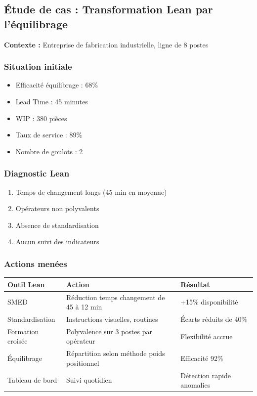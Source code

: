 \documentclass[12pt,a4paper]{article}
\begin{document}
\begin{center}
\subsection{Étude de cas : Transformation Lean par l'équilibrage}

\textbf{Contexte :} Entreprise de fabrication industrielle, ligne de 8 postes

\subsubsection{Situation initiale}
\begin{itemize}
    \item Efficacité équilibrage : 68\%
    \item Lead Time : 45 minutes
    \item WIP : 380 pièces
    \item Taux de service : 89\%
    \item Nombre de goulots : 2
\end{itemize}

\subsubsection{Diagnostic Lean}
\begin{enumerate}
    \item Temps de changement longs (45 min en moyenne)
    \item Opérateurs non polyvalents
    \item Absence de standardisation
    \item Aucun suivi des indicateurs
\end{enumerate}

\subsubsection{Actions menées}
\begin{table}[H]
\centering
\begin{tabular}{|p{3cm}|p{4cm}|p{5cm}|}
\hline
\textbf{Outil Lean} & \textbf{Action} & \textbf{Résultat} \\
\hline
SMED & Réduction temps changement de 45 à 12 min & +15\% disponibilité \\
\hline
Standardisation & Instructions visuelles, routines & Écarts réduits de 40\% \\
\hline
Formation croisée & Polyvalence sur 3 postes par opérateur & Flexibilité accrue \\
\hline
Équilibrage & Répartition selon méthode poids positionnel & Efficacité 92\% \\
\hline
Tableau de bord & Suivi quotidien & Détection rapide anomalies \\
\hline
\end{tabular}
\end{table}


\end{center}
\end{document}
